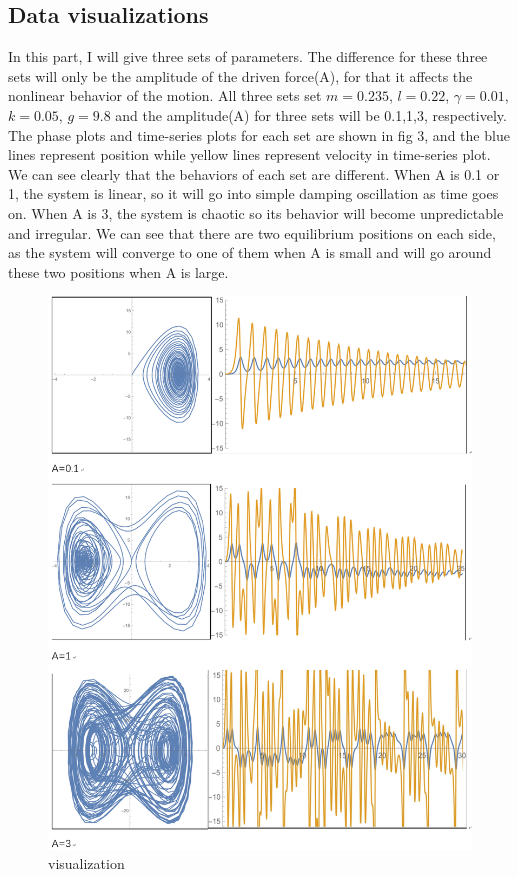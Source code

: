\documentclass{article}
\begin{document}
\subsection{\textbf{Data visualizations}}

In this part, I will give three sets of parameters. The difference for these three sets will only be the amplitude of the driven force(A), for that it affects the nonlinear behavior of the motion. All three sets set $m=0.235$, $l=0.22$, $\gamma=0.01$, $k=0.05$, $g=9.8$ and the amplitude(A) for three sets will be 0.1,1,3, respectively. The phase plots and time-series plots for each set are shown in fig 3, and the blue lines represent position while yellow lines represent velocity in time-series plot. We can see clearly that the behaviors of each set are different. When A is 0.1 or 1, the system is linear, so it will go into simple damping oscillation as time goes on. When A is 3, the system is chaotic so its behavior will become unpredictable and irregular. We can see that there are two equilibrium positions on each side, as the system will converge to one of them when A is small and will go around these two positions when A is large.

\begin{figure}[H]
	\centering
	\includegraphics[width=0.7\linewidth]{plot/vis}
	\caption{visualization}
	\label{fig:vis}
\end{figure}
\end{document}
